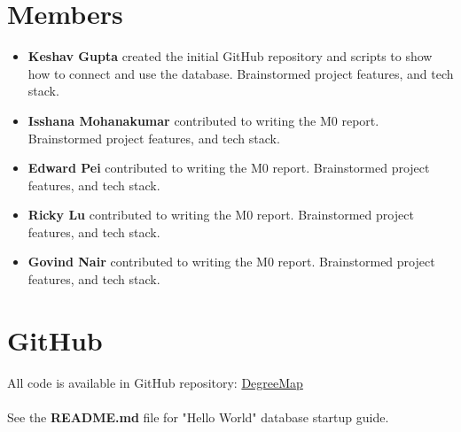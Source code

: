 \documentclass[12pt, a4paper]{article}
\begin{document}
\section*{Members}
\begin{itemize}
    \item \textbf{Keshav Gupta} created the initial GitHub repository and scripts to show how to connect and use the database. Brainstormed project features, and tech stack.
    \item \textbf{Isshana Mohanakumar} contributed to writing the M0 report. Brainstormed project features, and tech stack.
    \item \textbf{Edward Pei} contributed to writing the M0 report. Brainstormed project features, and tech stack.
    \item \textbf{Ricky Lu} contributed to writing the M0 report. Brainstormed project features, and tech stack.
    \item \textbf{Govind Nair} contributed to writing the M0 report. Brainstormed project features, and tech stack.

\end{itemize}
\section*{GitHub}

All code is available in GitHub repository: \href{https://github.com/Kggupta/DegreeMap}{DegreeMap}
\\\\See the \textbf{README.md} file for "Hello World" database startup guide.
\end{document}
